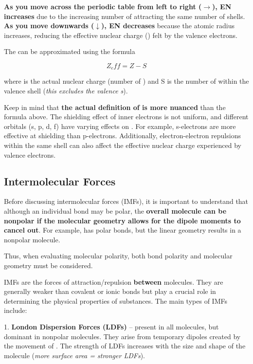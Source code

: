 \documentclass[10pt]{article}
\begin{document}
  \textbf{As you move across the periodic table from left to right ($\rightarrow$), EN increases} due to the increasing number of  attracting the same number of  shells. \textbf{As you move downwards ($\downarrow$), EN decreases} because the atomic radius increases, reducing the effective nuclear charge () felt by the valence electrons.

  The  can be approximated using the formula
  
  \[
  Z_eff = Z - S
  \]
  
  where  is the actual nuclear charge (number of ) and S is the number of  within the valence shell (\textit{this excludes the valence s}).

  \begin{definition}
  Keep in mind that \textbf{the actual definition of  is more nuanced} than the formula above. The shielding effect of inner electrons is not uniform, and different orbitals (s, p, d, f) have varying effects on . For example, s-electrons are more effective at shielding than p-electrons. Additionally, electron-electron repulsions within the same shell can also affect the effective nuclear charge experienced by valence electrons.
  \end{definition}

  \subsection{Intermolecular Forces}

  Before discussing intermolecular forces (IMFs), it is important to understand that although an individual bond may be polar, the \textbf{overall molecule can be nonpolar if the molecular geometry allows for the dipole moments to cancel out}. For example,  has polar bonds, but the linear geometry results in a nonpolar molecule.
  

  Thus, when evaluating molecular polarity, both bond polarity and molecular geometry must be considered.

  IMFs are the forces of attraction/repulsion \textbf{between} molecules. They are generally weaker than covalent or ionic bonds but play a crucial role in determining the physical properties of substances. The main types of IMFs include:

  1. \textbf{London Dispersion Forces (LDFs)} -- present in all molecules, but dominant in nonpolar molecules. They arise from temporary dipoles created by the movement of . The strength of LDFs increases with the size and shape of the molecule (\textit{more surface area = stronger LDFs}).
  
\end{document}
